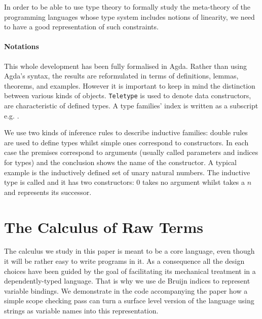 \documentclass[a4paper,UKenglish]{lipics-v2016}
\begin{document}
In order to be able to use type theory to formally study the meta-theory
of the programming languages whose type system includes notions of linearity,
we need to have a good representation of such constraints.

\paragraph*{Notations} This whole development has been fully formalised
in Agda. Rather than using Agda's syntax, the results are reformulated
in terms of definitions, lemmas, theorems, and examples. However it is
important to keep in mind the distinction between various kinds of objects.
\texttt{Teletype} is used to denote data constructors,  are characteristic of defined types. A type families' index is
written as a subscript e.g. .

We use two kinds of inference rules to describe inductive families: double
rules are used to define types whilst simple ones correspond to constructors.
In each case the premises correspond to arguments (usually called parameters
and indices for types) and the conclusion shows the name of the constructor.
A typical example is the inductively defined set of unary natural numbers.
The inductive type is called \Nat{} and it has two constructors: $0$ takes
no argument whilst \natsucc{\cdot} takes a \Nat{} $n$ and represents its successor.

\section{The Calculus of Raw Terms}

The calculus we study in this paper is meant to be a core language,
even though it will be rather easy to write programs in it. As a
consequence all the design choices have been guided by the goal
of facilitating its mechanical treatment in a dependently-typed language.
That is why we use de Bruijn indices to represent variable bindings.
We demonstrate in the code accompanying the paper how a simple scope
checking pass can turn a surface level version of the language using
strings as variable names into this representation.
\end{document}
